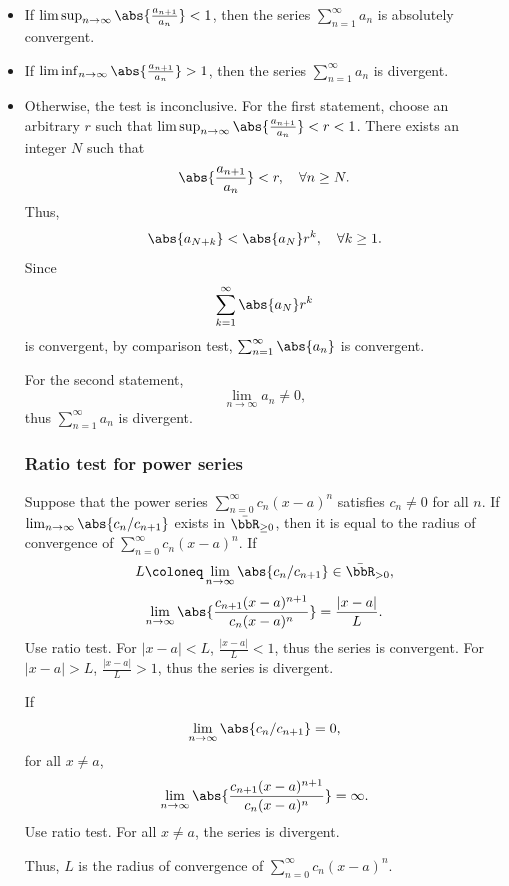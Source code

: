 \documentclass[a4paper,12pt]{report}
\begin{document}
\begin{itemize}
\begin{itemize}
An example of conditionally convergent $\sum_{n=1}^{\infty}a_n$ with convergent $\sum_{n=1}^{\infty}na_n$ is
\[a_n=\frac{(-1)^{n-1}}{n},\]
where $\sum_{n=1}^{\infty}a_n$ is convergent by alternating series test and $\sum_{n=1}^{\infty}na_n=\sum_{n=1}^{\infty}(-1)^{n-1}$ is divergent since $\lim_{n\to\infty}a_n$ is divergent.
\epr
\subsubsection{(d'Alembert's ratio or Cauchy) ratio test}
\ben
\item If $\limsup_{n\to\infty}\abs{\frac{a_{n+1}}{a_n}}<1$, then the series $\sum_{n=1}^{\infty}a_n$ is absolutely convergent.
\item If $\liminf_{n\to\infty}\abs{\frac{a_{n+1}}{a_n}}>1$, then the series $\sum_{n=1}^{\infty}a_n$ is divergent.
\item Otherwise, the test is inconclusive.
\een
\bpr
For the first statement, choose an arbitrary $r$ such that $\limsup_{n\to\infty}\abs{\frac{a_{n+1}}{a_n}}<r<1$. There exists an integer $N$ such that
\[\abs{\frac{a_{n+1}}{a_n}}<r,\quad\forall n\geq N.\]
Thus,
\[\abs{a_{N+k}}<\abs{a_N}r^k,\quad\forall k\geq 1.\]
Since
\[\sum_{k=1}^{\infty}\abs{a_N}r^k\]
is convergent, by comparison test, $\sum_{n=1}^{\infty}\abs{a_n}$ is convergent.

For the second statement,
\[\lim_{n\to\infty}a_n\neq 0,\]
thus $\sum_{n=1}^{\infty}a_n$ is divergent.
\epr
\subsubsection{Ratio test for power series}
Suppose that the power series $\sum_{n=0}^{\infty}c_n(x-a)^n$ satisfies $c_n\ne0$ for all $n$. If $\lim_{n\to\infty}\abs{c_n/c_{n+1}}$ exists in $\bar{\bbR}_{\ge0}$, then it is equal to the radius of convergence of $\sum_{n=0}^{\infty}c_n(x-a)^n$.
\bpr
If
\[L\coloneq\lim_{n\to\infty}\abs{c_n/c_{n+1}}\in\bar{\bbR}_{>0},\]
\[\lim_{n\to\infty}\abs{\frac{c_{n+1}(x-a)^{n+1}}{c_n(x-a)^n}}=\frac{|x-a|}{L}.\]
Use ratio test. For $|x-a|<L$, $\frac{|x-a|}{L}<1$, thus the series is convergent. For $|x-a|>L$, $\frac{|x-a|}{L}>1$, thus the series is divergent.

If
\[\lim_{n\to\infty}\abs{c_n/c_{n+1}}=0,\]
for all $x\ne a$,
\[\lim_{n\to\infty}\abs{\frac{c_{n+1}(x-a)^{n+1}}{c_n(x-a)^n}}=\infty.\]
Use ratio test. For all $x\ne a$, the series is divergent.

Thus, $L$ is the radius of convergence of $\sum_{n=0}^{\infty}c_n(x-a)^n$.
\epr

\end{itemize}
\end{itemize}
\end{document}
